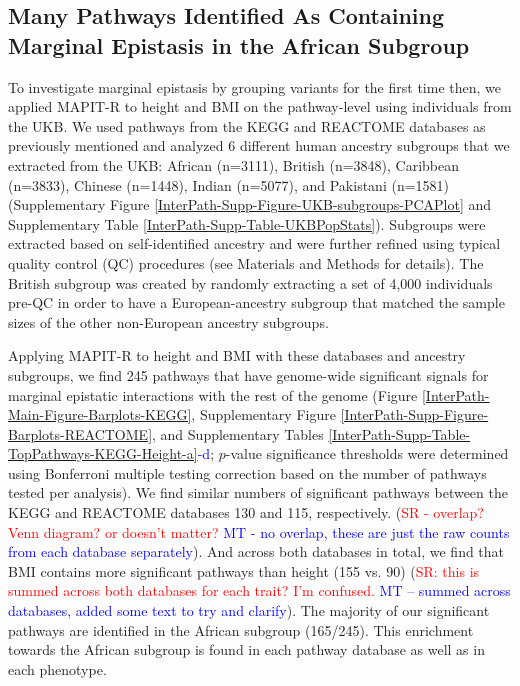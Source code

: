 \documentclass[12pt,a4paper]{article}
\newcommand{\red}[1]{\textcolor{red}{#1}}
\begin{document}
\subsection{Many Pathways Identified As Containing Marginal Epistasis in the African Subgroup}\label{InterPath-Results-PathwayEpistasis}

To investigate marginal epistasis by grouping variants for the first time then, we applied MAPIT-R to height and BMI on the pathway-level using individuals from the UKB. We used pathways from the KEGG and REACTOME databases \citep{Liberzon2011} as previously mentioned and analyzed 6 different human ancestry subgroups that we extracted from the UKB: African (n=3111), British (n=3848), Caribbean (n=3833), Chinese (n=1448), Indian (n=5077), and Pakistani (n=1581) (Supplementary Figure \ref{InterPath-Supp-Figure-UKB-subgroups-PCAPlot} and Supplementary Table \ref{InterPath-Supp-Table-UKBPopStats}). Subgroups were extracted based on self-identified ancestry and were further refined using typical quality control (QC) procedures (see Materials and Methods for details). The British subgroup was created by randomly extracting a set of 4,000 individuals pre-QC in order to have a European-ancestry subgroup that matched the sample sizes of the other non-European ancestry subgroups. 

Applying MAPIT-R to height and BMI with these databases and ancestry subgroups, we find 245 pathways that have genome-wide significant signals for marginal epistatic interactions with the rest of the genome (Figure \ref{InterPath-Main-Figure-Barplots-KEGG}, Supplementary Figure \ref{InterPath-Supp-Figure-Barplots-REACTOME}, and Supplementary Tables \ref{InterPath-Supp-Table-TopPathways-KEGG-Height-a}\textcolor{blue}{-d}; $p$-value significance thresholds were determined using Bonferroni multiple testing correction based on the number of pathways tested per analysis). We find similar numbers of significant pathways between the KEGG and REACTOME databases 130 and 115, respectively. (\red{SR - overlap? Venn diagram? or doesn't matter?} \textcolor{blue}{MT - no overlap, these are just the raw counts from each database separately}). And across both databases in total, we find that BMI contains more significant pathways than height (155 vs. 90) (\red{SR: this is summed across both databases for each trait? I'm confused.} \textcolor{blue}{MT -- summed across databases, added some text to try and clarify}). The majority of our significant pathways are identified in the African subgroup (165/245). This enrichment towards the African subgroup is found in each pathway database as well as in each phenotype.
\end{document}
